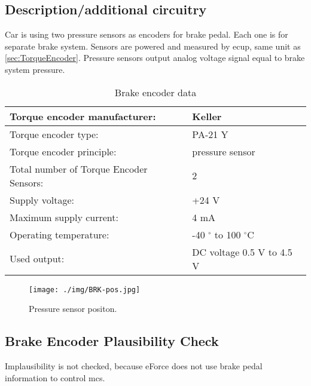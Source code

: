 \subsection{Description/additional circuitry}
Car is using two pressure sensors as encoders for brake pedal. Each one is for separate brake system. Sensors are powered and measured by \gls{ecup}, same unit as \ref{sec:TorqueEncoder}. Pressure sensors output analog voltage signal equal to brake system pressure. 


\begin{table}[H]
	\centering
	\caption{Brake encoder data}
	\begin{tabularx}{\textwidth}{|X|X|}
		\hline
		Torque encoder manufacturer: &  Keller \\[\TableSize]\hline
		Torque encoder type: & PA-21 Y \\[\TableSize]\hline
		Torque encoder principle: & pressure sensor \\[\TableSize]\hline
		Total number of Torque Encoder Sensors: & 2 \\[\TableSize]\hline
		Supply voltage: & +24 V \\[\TableSize]\hline
		Maximum supply current: &  4 mA  \\[\TableSize]\hline
		Operating temperature: & -40 $^\circ$ to 100 $^\circ$C \\[\TableSize]\hline
		Used output: & DC voltage 0.5 V to 4.5 V \\[\TableSize]\hline
	\end{tabularx}%
	\label{tab:brake-general}%
\end{table}%

\begin{figure}[H]
	\begin{center}
		\texttt{[image: ./img/BRK-pos.jpg]}
		\caption{Pressure sensor positon.}
		\label{fig:brake_pressure_position}
	\end{center}
\end{figure}

\subsection{Brake Encoder Plausibility Check}
Implausibility is not checked, because eForce does not use brake pedal information to control \glspl{mc}.

%
%




